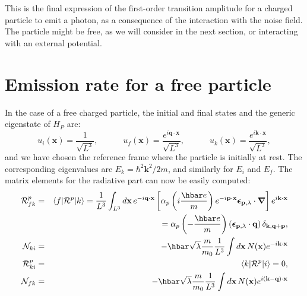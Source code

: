 \documentclass[12pt,onecolumn,amssymb,nofootinbib]{revtex4-2} %
\newcommand*{\boldvec}[1]{\ensuremath{\boldsymbol{#1}}}%
\let\vec\boldvec%
\begin{document}
This is the final expression of the first-order transition amplitude for a
charged particle to emit a photon, as a consequence of the interaction with the
noise field. The particle might be free, as we will consider in the next
section, or interacting with an external potential.

\section{Emission rate for a free particle}
\label{sec:two}

In the case of a free charged particle, the initial and final states and the
generic eigenstate of $H_{P}$ are:
\begin{equation}
u_{i}(\mathbf{x}) = \frac{1}{\sqrt{L^{3}}}, \qquad\quad
u_{f}(\mathbf{x}) = \frac{e^{i\mathbf{q}\cdot\mathbf{x}}}{\sqrt{L^{3}}}, \qquad\quad
u_{k}(\mathbf{x}) = \frac{e^{i\mathbf{k}\cdot\mathbf{x}}}{\sqrt{L^{3}}},
\end{equation}
and we have chosen the reference frame where the particle is initially at rest.
The corresponding eigenvalues are $E_{k}= \hbar^{2}\mathbf{k}^{2}/2m$, and
similarly for $E_i$ and $E_f$. The matrix elements for the radiative part can
now be easily computed:
\begin{eqnarray}
{\mathcal R}_{fk}^{p} & = & \langle f |{\mathcal R}^{p} | k \rangle
= \frac{1}{L^{3}} \int_{L^3} d\mathbf{x}\,
e^{-i\mathbf{q}\cdot\mathbf{x}} \left[\alpha_{p}\left(i\frac{\hbar
e}{m}\right) e^{-i\mathbf{p}\cdot\mathbf{x}}
\vec{\epsilon}_{\mathbf{p},\lambda} \cdot \vec{\nabla}\right]
e^{i\mathbf{k}\cdot\mathbf{x}}
\nonumber \\
& & \qquad\qquad\, = \alpha_{p}\left(-\frac{\hbar e}{m}\right)\left(\vec{\epsilon}_{\mathbf
{p},\lambda}
\cdot \mathbf{q}\right)\delta_{\mathbf{k,q+p}}, \label{eq:ppo} \\
{\mathcal N}_{ki} & = & -\hbar \sqrt{\lambda} \frac{m}{m_0} \frac{1}{L^3} \int d {\bf x} \, N({\bf x}) e^{-i {\bf k} \cdot {\bf x}} \label{eq:1bis }\\
{\mathcal R}_{ki}^{p} & = & \langle k |{\mathcal R}^{p} | i \rangle = 0, \label{eq:1}\\
{\mathcal N}_{fk} & = & -\hbar \sqrt{\lambda} \frac{m}{m_0} \frac{1}{L^3} \int d {\bf x} \, N({\bf x}) e^{i ({\bf k} - {\bf q}) \cdot {\bf x}}  \label{eq:1ter}
\end{eqnarray}
\end{document}
